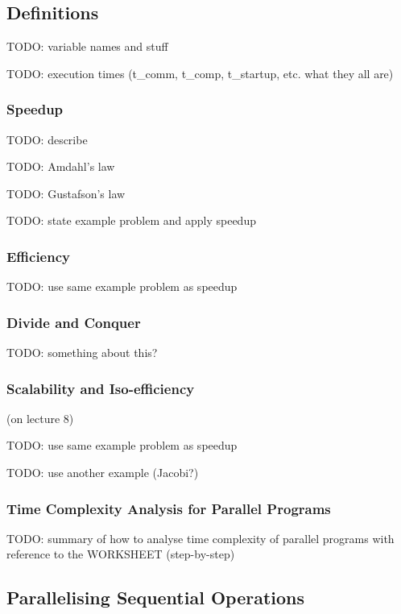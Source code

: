 \documentclass{article}
\begin{document}
\subsection{Definitions}

TODO: variable names and stuff

TODO: execution times (t\_comm, t\_comp, t\_startup, etc. what they all are)

\subsubsection{Speedup}

TODO: describe

TODO: Amdahl's law

TODO: Gustafson's law

TODO: state example problem and apply speedup

\subsubsection{Efficiency}

TODO: use same example problem as speedup

\subsubsection{Divide and Conquer}

TODO: something about this?

\subsubsection{Scalability and Iso-efficiency}

(on lecture 8)

TODO: use same example problem as speedup

TODO: use another example (Jacobi?)

\subsubsection{Time Complexity Analysis for Parallel Programs}

TODO: summary of how to analyse time complexity of parallel programs with reference to the WORKSHEET (step-by-step)

\subsection{Parallelising Sequential Operations}
\end{document}

